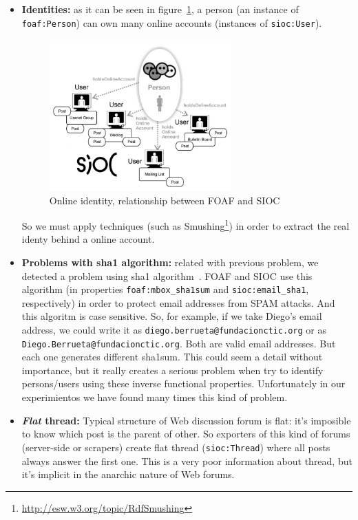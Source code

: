 \documentclass{../templates/www2008-submission}
\begin{document}
\begin{itemize}
  \item \textbf{Identities:} as it can be seen in figure~\ref{fig:foaf-sioc},
	a person (an instance of \texttt{foaf:Person}) can own many online 
	accounts (instances of \texttt{sioc:User}). 

	\begin{figure}[ht]
	 \centering
	 \includegraphics[width=7cm]{images/foaf-sioc.png}
	 \caption{\label{fig:foaf-sioc}Online identity, relationship between FOAF and SIOC}
	\end{figure}

	So we must apply techniques (such as 
	Smushing\footnote{\url{http://esw.w3.org/topic/RdfSmushin}g})
	in order to extract the real identy behind a online account.

  \item \textbf{Problems with sha1 algorithm:} related with previous problem,
	we detected a problem using sha1 algorithm~\cite{Eastlake2001}. FOAF 
	and SIOC use this algorithm (in properties \texttt{foaf:mbox\_sha1sum} 
	and \texttt{sioc:email\_sha1}, respectively) in order to protect email 
	addresses from SPAM attacks. And this algoritm is case sensitive. So,
	for example, if we take Diego's email address, we could write it as
	\texttt{diego.berrueta@fundacionctic.org} or as \texttt{Diego.Berrueta@fundacionctic.org}.
	Both are valid email addresses. But each one generates different sha1sum.
	This could  seem a detail without importance, but it really creates a 
	serious problem when try to identify persons/users using these
	inverse functional properties. Unfortunately in our experimientos we 
	have found many times this kind of problem.

  \item \textbf{\textit{Flat} thread:} Typical structure of Web discussion
	forum is flat: it's imposible to know which post is the parent of
	other. So exporters of this kind of forums (server-side or scrapers)
	create flat thread (\texttt{sioc:Thread}) where all posts always answer
	the first one. This is a very poor information about thread, but it's
	implicit in the anarchic nature of Web forums.


\end{itemize}
\end{document}
